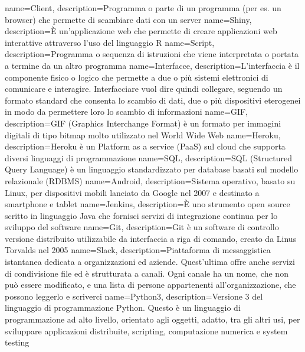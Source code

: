 {
	name=Client,
	description={Programma o parte di un programma (per es. un browser) che permette di scambiare dati con un server}
}
 {
	name=Shiny,
	description={È un'applicazione web che permette di creare applicazioni web interattive attraverso l'uso del linguaggio R}
}
 {
	name=Script,
	description={Programma o sequenza di istruzioni che viene interpretata o portata a termine da un altro programma}
}
 {
	name=Interfacce,
	description={L'interfaccia è il componente fisico o logico che permette a due o più sistemi elettronici di comunicare e interagire. Interfacciare vuol dire quindi collegare, seguendo un formato standard che consenta lo scambio di dati, due o più dispositivi eterogenei in modo da permettere loro lo scambio di informazioni}
}
 {
	name=GIF,
	description={GIF (Graphics Interchange Format) è un formato per immagini digitali di tipo bitmap molto utilizzato nel World Wide Web}
}
 {
	name=Heroku,
	description={Heroku è un Platform as a service (PaaS) sul cloud che supporta diversi linguaggi di programmazione}
}
 {
	name=SQL,
	description={SQL (Structured Query Language) è un linguaggio standardizzato per database basati sul modello relazionale (RDBMS)}
}
 {
	name=Android,
	description={Sistema operativo, basato su Linux, per dispositivi mobili lanciato da Google nel 2007 e destinato a smartphone e tablet}
}
 {
	name=Jenkins,
	description={È uno strumento open source scritto in linguaggio Java che fornisci servizi di integrazione continua per lo sviluppo del software}
}
 {
	name=Git,
	description={Git è un software di controllo versione distribuito utilizzabile da interfaccia a riga di comando, creato da Linus Torvalds nel 2005}
}
 {
	name=Slack,
	description={Piattaforma di messaggistica istantanea dedicata a organizzazioni ed aziende. Quest'ultima offre anche servizi di condivisione file ed è strutturata a canali. Ogni canale ha un nome, che non può essere modificato, e una lista di persone appartenenti all'organizzazione, che possono leggerlo e scriverci}
}
 {
	name=Python3,
	description={Versione 3 del linguaggio di programmazione Python. Questo è un linguaggio di programmazione ad alto livello, orientato agli oggetti, adatto, tra gli altri usi, per sviluppare applicazioni distribuite, scripting, computazione numerica e system testing}
}
